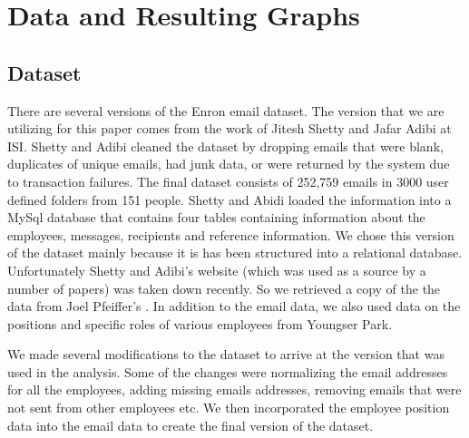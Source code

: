 \documentclass[12pt]{article}
\begin{document}
\section{Data and Resulting Graphs}
	\subsection{Dataset}
	There are several versions of the Enron email dataset. The version that we are utilizing for this paper comes from the work of Jitesh Shetty and Jafar Adibi \cite{shetty} at ISI. Shetty and Adibi cleaned the dataset by dropping emails that were blank, duplicates of unique emails, had junk data, or were returned by the system due to transaction failures. The final dataset consists of 252,759 emails in 3000 user defined folders from 151 people. Shetty and Abidi loaded the information into a MySql database that contains four tables containing information about the employees, messages, recipients and reference information. We chose this version of the dataset mainly because it is has been structured into a relational database. Unfortunately Shetty and Adibi's website (which was used as a source by a number of papers) was taken down recently. So we retrieved a copy of the the data from Joel Pfeiffer's \cite{pfeiffer}. In addition to the email data, we also used data on the positions and specific roles of various employees from Youngser Park\cite{park}. \par
	We made several modifications to the dataset to arrive at the version that was used in the analysis. Some of the changes were normalizing the email addresses for all the employees, adding missing emails addresses, removing emails that were not sent from other employees etc. We then incorporated the employee position data into the email data to create the final version of the dataset. 
\end{document}
